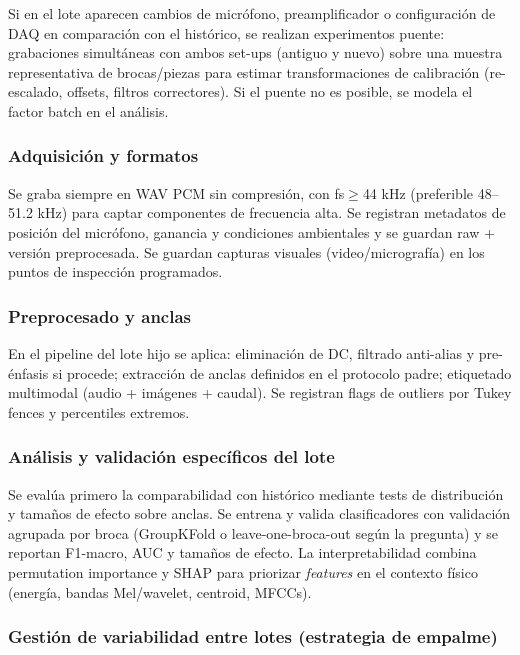 \documentclass[12pt, letterpaper]{report}
\begin{document}
Si en el lote aparecen cambios de micrófono, preamplificador o configuración de DAQ en comparación con el histórico, se realizan experimentos puente: grabaciones simultáneas con ambos set-ups (antiguo y nuevo) sobre una muestra representativa de brocas/piezas para estimar transformaciones de calibración (re-escalado, offsets, filtros correctores). Si el puente no es posible, se modela el factor batch en el análisis.

\subsubsection{Adquisición y formatos}

Se graba siempre en WAV PCM sin compresión, con fs$\geq$44 kHz (preferible 48--51.2 kHz) para captar componentes de frecuencia alta. Se registran metadatos de posición del micrófono, ganancia y condiciones ambientales y se guardan raw + versión preprocesada. Se guardan capturas visuales (video/micrografía) en los puntos de inspección programados.

\subsubsection{Preprocesado y anclas}

En el pipeline del lote hijo se aplica: eliminación de DC, filtrado anti-alias y pre-énfasis si procede; extracción de anclas definidos en el protocolo padre; etiquetado multimodal (audio + imágenes + caudal). Se registran flags de outliers por Tukey fences y percentiles extremos.

\subsubsection{Análisis y validación específicos del lote}

Se evalúa primero la comparabilidad con histórico mediante tests de distribución y tamaños de efecto sobre anclas. Se entrena y valida clasificadores con validación agrupada por broca (GroupKFold o leave-one-broca-out según la pregunta) \cite{geron2023} y se reportan F1-macro, AUC y tamaños de efecto. La interpretabilidad combina permutation importance y SHAP \cite{lundberg2017} para priorizar \textit{features} en el contexto físico (energía, bandas Mel/wavelet, centroid, MFCCs).

\subsubsection{Gestión de variabilidad entre lotes (estrategia de empalme)}
\end{document}
